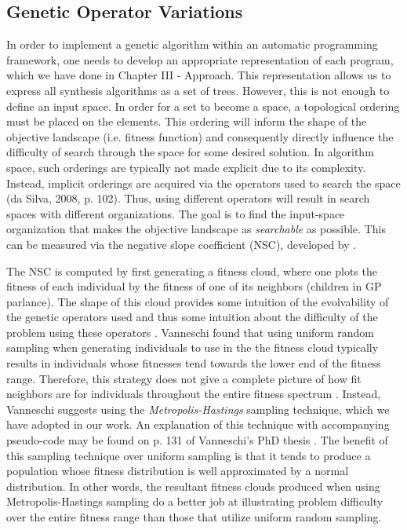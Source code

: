 \documentclass[12pt]{report} 	%
\numberwithin{figure}{chapter}
\numberwithin{table}{chapter}
\numberwithin{equation}{chapter}
\begin{document}
\begin{flushleft}
\vspace{12pt}\section{Genetic Operator Variations}
In order to implement a genetic algorithm within an automatic programming framework, one needs to develop an appropriate representation of each program, which we have done in Chapter III - Approach. This representation allows us to express all synthesis algorithms as a set of trees. However, this is not enough to define an input space. In order for a set to become a space, a topological ordering must be placed on the elements. This ordering will inform the shape of the objective landscape (i.e. fitness function) and consequently directly influence the difficulty of search through the space for some desired solution. In algorithm space, such orderings are typically not made explicit due to its complexity. Instead, implicit orderings are acquired via the operators used to search the space (da Silva, 2008, p. 102). Thus, using different operators will result in search spaces with different organizations. The goal is to find the input-space organization that makes the objective landscape as \textit{searchable} as possible. This can be measured via the negative slope coefficient (NSC), developed by \cite[p. 54]{Vanneschi:2004le}.

The NSC is computed by first generating a fitness cloud, where one plots the fitness of each individual by the fitness of one of its neighbors (children in GP parlance). The shape of this cloud provides some intuition of the evolvability of the genetic operators used and thus some intuition about the difficulty of the problem using these operators \cite[p. 130]{Vanneschi:2004le}. Vanneschi found that using uniform random sampling when generating individuals to use in the the fitness cloud typically results in individuals whose fitnesses tend towards the lower end of the fitness range. Therefore, this strategy does not give a complete picture of how fit neighbors are for individuals throughout the entire fitness spectrum \cite[p. 132]{Vanneschi:2004le}. Instead, Vanneschi suggests using the \textit{Metropolis-Hastings} sampling technique, which we have adopted in our work. An explanation of this technique with accompanying pseudo-code may be found on p. 131 of Vanneschi's PhD thesis \cite{Vanneschi:2004le}. The benefit of this sampling technique over uniform sampling is that it tends to produce a population whose fitness distribution is well approximated by a normal distribution. In other words, the resultant fitness clouds produced when using Metropolis-Hastings sampling do a better job at illustrating problem difficulty over the entire fitness range than those that utilize uniform random sampling.


\end{flushleft}
\end{document}
